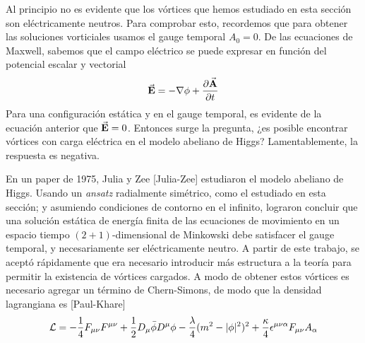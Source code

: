 Al principio no es evidente que los vórtices que hemos estudiado en esta sección son eléctricamente neutros. Para comprobar esto, recordemos que para obtener las soluciones vorticiales usamos el gauge temporal $A_0=0$. De las ecuaciones de Maxwell, sabemos que el campo eléctrico se puede expresar en función del potencial escalar y vectorial
\begin{align}
	\vec{\mathbf{E}} = -\nabla\phi+\frac{\partial \vec{\mathbf{A}}}{\partial t}
\end{align}
Para una configuración estática y en el gauge temporal, es evidente de la ecuación anterior que $\vec{\mathbf{E}}=0$. Entonces surge la pregunta, ¿es posible encontrar vórtices con carga eléctrica en el modelo abeliano de Higgs? Lamentablemente, la respuesta es negativa.

En un paper de 1975, Julia y Zee [Julia-Zee] estudiaron el modelo abeliano de Higgs. Usando un \emph{ansatz} radialmente simétrico, como el estudiado en esta sección; y asumiendo condiciones de contorno en el infinito, lograron concluir que una solución estática de energía finita de las ecuaciones de movimiento en un espacio tiempo $(2+1)$-dimensional de Minkowski debe satisfacer el gauge temporal, y necesariamente ser eléctricamente neutro. A partir de este trabajo, se aceptó rápidamente que era necesario introducir más estructura a la teoría para permitir la existencia de vórtices cargados. A modo de obtener estos vórtices es necesario agregar un término de Chern-Simons, de modo que la densidad lagrangiana es [Paul-Khare]
\begin{align}
	\mathcal{L} = -\frac{1}{4}F_{\mu\nu}F^{\mu\nu}+\frac{1}{2}D_\mu\bar\phi D^\mu\phi-\frac{\lambda}{4}(m^2-|\phi|^2)^2+\frac{\kappa}{4}\epsilon^{\mu\nu\alpha}F_{\mu\nu}A_\alpha
\end{align}